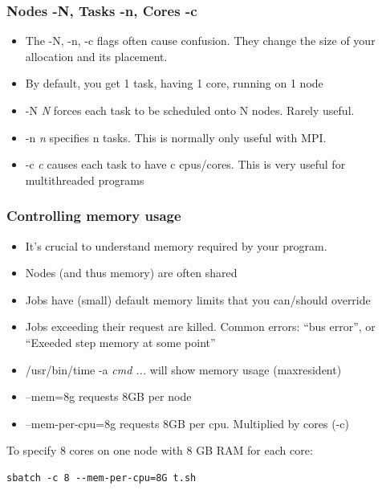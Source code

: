 \documentclass[10pt]{beamer}
\begin{document}
\begin{frame}[fragile]
\frametitle{Nodes -N, Tasks -n, Cores -c}
\begin{itemize}
\item The -N, -n, -c flags often cause confusion.  They change the size of your allocation and its placement.
\item By default, you get 1 task, having 1 core, running on 1 node
\item -N \textit{N} forces each task to be scheduled onto N nodes.  Rarely useful.
\item -n \textit{n} specifies n tasks.  This is normally only useful with MPI.
\item -c \textit{c} causes each task to have c cpus/cores.  This is very useful for multithreaded programs
\end{itemize}
\end{frame}

\begin{frame}[fragile]
\frametitle{Controlling memory usage}
\begin{itemize}
\item It's crucial to understand memory required by your program.
\item Nodes (and thus memory) are often shared
\item Jobs have (small) default memory limits that you can/should override
\item Jobs exceeding their request are killed.  Common errors: ``bus error'', or ``Exeeded step memory at some point''
\item /usr/bin/time -a \textit{cmd ...} will show memory usage (maxresident)
\item --mem=8g requests 8GB per node
\item --mem-per-cpu=8g requests 8GB per cpu.  Multiplied by cores (-c)

\end{itemize}

To specify 8 cores on one node with 8 GB RAM for each core:
\begin{verbatim}
sbatch -c 8 --mem-per-cpu=8G t.sh
\end{verbatim}
\end{frame}
\end{document}
